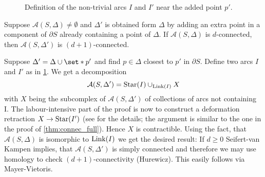 \begin{figure}[thb]
	\centering
	\caption{Definition of the non-trivial arcs $I$ and $I'$ near the added point $p'$.}\label{fig:arcs_lemma_d_dplus1}
\end{figure}
\begin{lemma}[label=lem:d_dplus1]
	Suppose $\mathcal{A}(S,\Delta) \neq \emptyset$ and $\Delta'$ is obtained form $\Delta$ by adding an extra point in a component of $\partial S$ already containing a point of $\Delta$.
	If $\mathcal{A}(S,\Delta)$ is $d$-connected, then $\mathcal{A}(S,\Delta')$ is $(d+1)$-connected.
\end{lemma}
\begin{sketch}
	Suppose $\Delta' = \Delta \cup \set*{p'}$ and find $p \in \Delta$ closest to $p'$ in $\partial S$.
	Define two arcs $I$ and $I'$ as in \cref{fig:arcs_lemma_d_dplus1}.
	We get a decomposition
	\[
		\mathcal{A}(S,\Delta') = \operatorname{Star}(I) \cup_{\operatorname{Link}(I)} X
	\]
	with $X$ being the subcomplex of $\mathcal{A}(S,\Delta')$ of collections of arcs not containing I.
	The labour-intensive part of the proof is now to construct a deformation retraction $X \to \operatorname{Star}(I')$ (see \textcite{wahlHomological} for the details; the argument is similar to the one in the proof of \autoref{thm:connec_full}).
	Hence $X$ is contractible.
	Using the fact, that $\mathcal{A}(S,\Delta)$ is isomorphic to $\operatorname{Link}(I)$ we get the desired result: 
	If $d \ge 0$ Seifert-van Kampen implies, that $\mathcal{A}(S,\Delta')$ is simply connected and therefore we may use homology to check $(d+1)$-connectivity (Hurewicz).
	This easily follows via Mayer-Vietoris.
\end{sketch}

